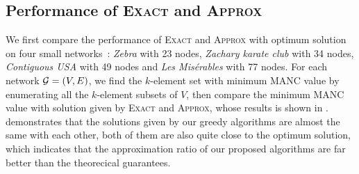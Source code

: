 \documentclass[sigconf]{acmart}
\begin{document}




\subsection{Performance of \textsc{Exact} and \textsc{Approx}}

We first compare the performance of \textsc{Exact} and \textsc{Approx} with optimum solution on four small networks~\cite{Ku13}: \textit{Zebra} with 23 nodes, \textit{Zachary karate club} with 34 nodes, \textit{Contiguous USA} with 49 nodes and \textit{Les Misérables} with 77 nodes.
For each network \(\mathcal{G}=(V,E)\), we find the \(k\)-element set with minimum MANC value by enumerating all the \(k\)-element subsets of \(V\), then compare the minimum MANC value with solution given by \textsc{Exact} and \textsc{Approx}, whose results is shown in .
 demonstrates that the solutions given by our greedy algorithms are almost the same with each other, both of them are also quite close to the optimum solution, which indicates that the approximation ratio of our proposed algorithms are far better than the theorecical guarantees.
\end{document}

